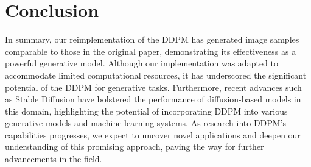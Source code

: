 \documentclass[letterpaper]{article} %
\begin{document}
\section{Conclusion}
In summary, our reimplementation of the DDPM has generated image samples comparable to those in the original paper, demonstrating its effectiveness as a powerful generative model. Although our implementation was adapted to accommodate limited computational resources, it has underscored the significant potential of the DDPM for generative tasks. Furthermore, recent advances such as Stable Diffusion have bolstered the performance of diffusion-based models in this domain, highlighting the potential of incorporating DDPM into various generative models and machine learning systems. As research into DDPM's capabilities progresses, we expect to uncover novel applications and deepen our understanding of this promising approach, paving the way for further advancements in the field.


\end{document}

